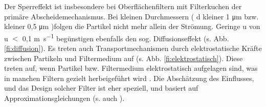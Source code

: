 Der Sperreffekt ist insbesondere bei Oberflächenfiltern mit Filterkuchen der primäre Abscheidemechanismus. \cite{vdi3677_2} 
Bei kleinen Durchmessern ( \ac{d} kleiner 1 \si{\micro\metre} \cite{Grundlagen_Filtertechnik} bzw. kleiner 0,5 \si{\micro\metre} \cite{vdi3677_2} )folgen die Partikel nicht mehr allein der Strömung. Geringe \ac{u} von \ac{u} $<$ 0,1 \si{\metre\per\second} begünstigen ebenfalls den sog. Diffusionseffekt (s. Abb. \ref{fi:diffusion}).
Es treten auch Transportmechanismen durch elektrostatische Kräfte zwischen Partikeln und Filtermedium auf (s. Abb. \ref{fi:elektrostatisch}). Diese treten auf, wenn Partikel bzw. Filtermedium elektrostatisch aufgelagen sind, was in manchen Filtern gezielt herbeigeführt wird \cite{vdi3677_2}. Die Abschätzung des Einflusses, und das Design solcher Filter ist eher speziell, und basiert auf Approximationsgleichungen (s. auch \cite{faser_elektro}).
